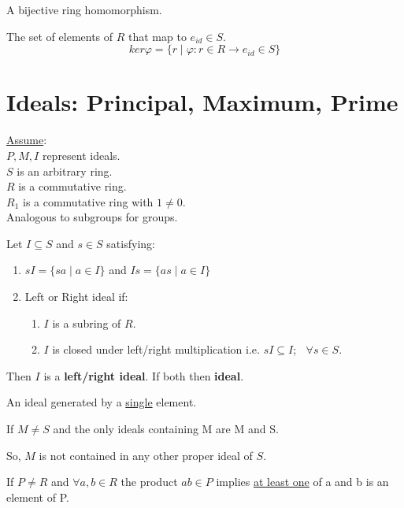 \begin{defn}
	A bijective ring homomorphism.
\end{defn}

\begin{defn}
	The set of elements of $R$ that map to ${e}_{id} \in S$.
	\[ker\varphi = \{r \mid \varphi: r \in R \to {e}_{id}\in S \}\]
\end{defn}

\section{Ideals: Principal, Maximum, Prime}
\underline{Assume}: \\ 
$P, M, I$ represent ideals. \\
$S$ is an arbitrary ring. \\
$R$ is a commutative ring. \\
${R}_{1}$ is a commutative ring with $1 \not = 0$. \\

Analogous to subgroups for groups.
\begin{defn}[Ideal $I$]
	Let $I \subseteq S$ and $s \in S$ satisfying:
	\begin{enumerate}
		\item $sI = \{sa \mid a \in I\}$ and $ Is = \{as \mid a \in I\}$
		\item Left or Right ideal if:
		\begin{enumerate}
			\item $I$ is a subring of $R$.
			\item $I$ is closed under left/right multiplication i.e. $sI \subseteq I$;  $\;\;\forall s \in S$.
		\end{enumerate}
	\end{enumerate}
Then $I$ is a \textbf{left/right ideal}.
If both then \textbf{ideal}.
\end{defn}
\begin{defn}
	An ideal generated by a \underline{single} element.
\end{defn}
\begin{defn}
	If $M \not = S$ and the only ideals containing M are M and S.
\end{defn}
So, $M$ is not contained in any other proper ideal of $S$.
\begin{defn}
	If $P \not = R$ and $\forall a, b \in R$ the product $ab \in P$ implies \underline{at least one} of a and b is an element of P.
	
\end{defn}